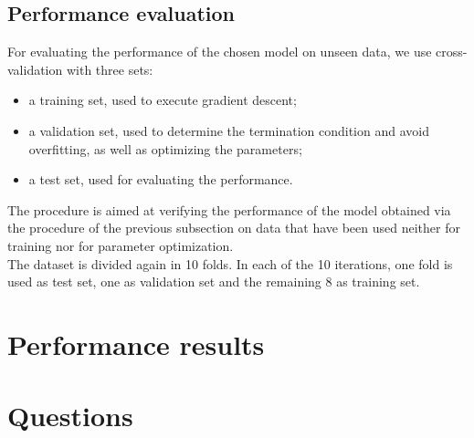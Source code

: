 \documentclass{article}
\begin{document}
\subsection{Performance evaluation}
For evaluating the performance of the chosen model on unseen data, we use cross-validation with three sets:
\begin{itemize}
	\item a training set, used to execute gradient descent;
	\item a validation set, used to determine the termination condition and avoid overfitting, as well as optimizing the parameters;
	\item a test set, used for evaluating the performance.
\end{itemize}
The procedure is aimed at verifying the performance of the model obtained via the procedure of the previous subsection on data that have been used neither for training nor for parameter optimization.\\
The dataset is divided again in 10 folds. In each of the 10 iterations, one fold is used as test set, one as validation set and the remaining 8 as training set.

\section{Performance results}


\section{Questions}
\end{document}
